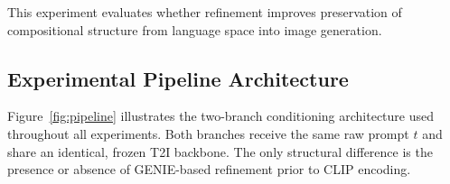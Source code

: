 \documentclass[a4paper,twoside,12pt]{report}
\begin{document}
This experiment evaluates whether refinement improves preservation of compositional structure from language space into image generation.


\subsection{Experimental Pipeline Architecture}

Figure~\ref{fig:pipeline} illustrates the two-branch conditioning architecture used throughout all experiments. Both branches receive the same raw prompt \(t\) and share an identical, frozen T2I backbone. The only structural difference is the presence or absence of GENIE-based refinement prior to CLIP encoding.

\end{document}

